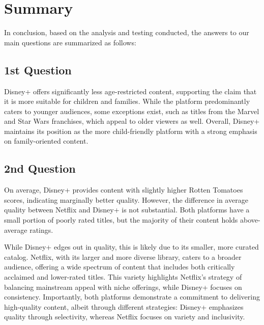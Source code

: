 \section{Summary}
In conclusion, based on the analysis and testing conducted, the answers to our main questions are summarized as follows:

\subsection{1st Question}
Disney+ offers significantly less age-restricted content, supporting the claim that it is more suitable for children and families. While the platform predominantly caters to younger audiences, some exceptions exist, such as titles from the Marvel and Star Wars franchises, which appeal to older viewers as well. Overall, Disney+ maintains its position as the more child-friendly platform with a strong emphasis on family-oriented content.

\subsection{2nd Question}
On average, Disney+ provides content with slightly higher Rotten Tomatoes scores, indicating marginally better quality. However, the difference in average quality between Netflix and Disney+ is not substantial. Both platforms have a small portion of poorly rated titles, but the majority of their content holds above-average ratings.

While Disney+ edges out in quality, this is likely due to its smaller, more curated catalog. Netflix, with its larger and more diverse library, caters to a broader audience, offering a wide spectrum of content that includes both critically acclaimed and lower-rated titles. This variety highlights Netflix's strategy of balancing mainstream appeal with niche offerings, while Disney+ focuses on consistency. Importantly, both platforms demonstrate a commitment to delivering high-quality content, albeit through different strategies: Disney+ emphasizes quality through selectivity, whereas Netflix focuses on variety and inclusivity.
